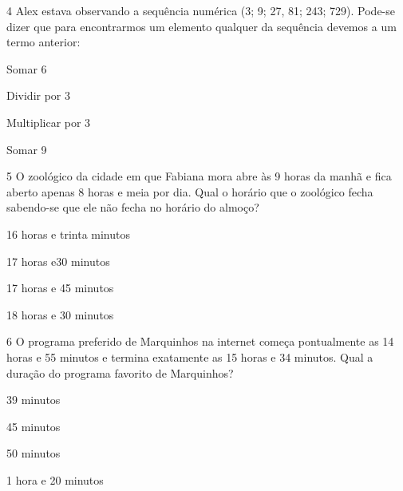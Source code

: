 \num{4} Alex estava observando a sequência numérica (3; 9; 27, 81; 243;
729). Pode-se dizer que para encontrarmos um elemento qualquer da
sequência devemos a um termo anterior:

\begin{escolha}
\item
  Somar 6
\item
  Dividir por 3
\item
  Multiplicar por 3
\item
  Somar 9
\end{escolha}


\num{5} O zoológico da cidade em que Fabiana mora abre às 9 horas da manhã
e fica aberto apenas 8 horas e meia por dia. Qual o horário que o
zoológico fecha sabendo-se que ele não fecha no horário do almoço?

\begin{escolha}
\item
  16 horas e trinta minutos
\item
  17 horas e30 minutos
\item
  17 horas e 45 minutos
\item
  18 horas e 30 minutos
\end{escolha}


\num{6} O programa preferido de Marquinhos na internet começa pontualmente
as 14 horas e 55 minutos e termina exatamente as 15 horas e 34 minutos.
Qual a duração do programa favorito de Marquinhos?

\begin{escolha}
\item
  39 minutos
\item
  45 minutos
\item
  50 minutos
\item
  1 hora e 20 minutos
\end{escolha}


